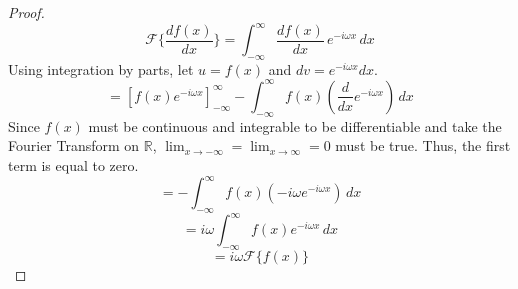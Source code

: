 \begin{proof}
    \[ \mathcal{F}\{ \frac{d f(x)}{dx} \} = \int_{-\infty}^{\infty} \frac{d f(x)}{dx}  \, e^{-i \omega x} \,dx \]
    Using integration by parts, let \(u = f(x)\) and \(dv = e^{-i \omega x} dx\).
    \[ = \left[ f(x) e^{-i \omega x} \right]_{-\infty}^{\infty} - \int_{-\infty}^{\infty} f(x) \left( \frac{d}{dx} e^{-i \omega x} \right) \,dx \]
    Since \(f(x)\) must be continuous and integrable to be differentiable and take the Fourier Transform on \(\mathbb{R}\), \(\lim_{x \to -\infty}=\lim_{x \to \infty}=0\) must be true. Thus, the first term is equal to zero. 
    \[ = - \int_{-\infty}^{\infty} f(x) \left( -i \omega e^{-i \omega x} \right) \,dx \]
    \[ = i \omega \int_{-\infty}^{\infty} f(x) e^{-i \omega x} \,dx \]
    \[ = i \omega \mathcal{F}\{ f(x) \} \]
\end{proof}